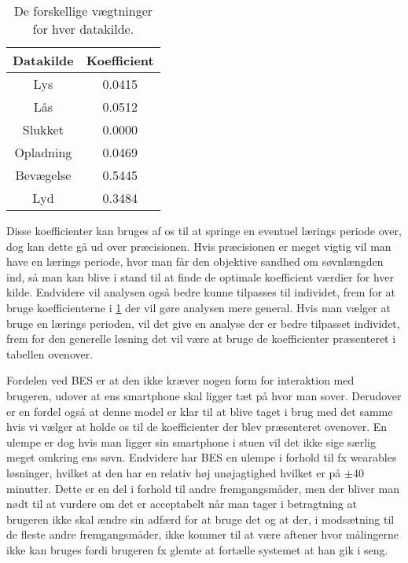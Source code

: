 \begin{table}[h]
\centering
\begin{tabular}{|c|c|}
\hline Datakilde & Koefficient\\
\hline Lys & 0.0415 \\ 
\hline Lås & 0.0512 \\ 
\hline Slukket & 0.0000 \\ 
\hline Opladning & 0.0469 \\ 
\hline Bevægelse & 0.5445 \\ 
\hline Lyd & 0.3484 \\ 
\hline 
\end{tabular}
\caption{De forskellige vægtninger for hver datakilde.}
\label{tab:vaegtninger}
\end{table}

Disse koefficienter kan bruges af os til at springe en eventuel lærings periode over, dog kan dette gå ud over præcisionen.
Hvis præcisionen er meget vigtig vil man have en lærings periode, hvor man får den objektive sandhed om søvnlængden ind, så man kan blive i stand til at finde de optimale koefficient værdier for hver kilde.
Endvidere vil analysen også bedre kunne tilpasses til individet, frem for at bruge koefficienterne i \cref{tab:vaegtninger} der vil gøre analysen mere general.
Hvis man vælger at bruge en lærings perioden, vil det give en analyse der er bedre tilpasset individet, frem for den generelle løsning det vil være at bruge de koefficienter præsenteret i tabellen ovenover.

Fordelen ved BES er at den ikke kræver nogen form for interaktion med brugeren, udover at ens smartphone skal ligger tæt på hvor man sover.
Derudover er en fordel også at denne model er klar til at blive taget i brug med det samme hvis vi vælger at holde os til de koefficienter der blev præsenteret ovenover.
En ulempe er dog hvis man ligger sin smartphone i stuen vil det ikke sige særlig meget omkring ens søvn.
Endvidere har BES en ulempe i forhold til fx wearables løsninger, hvilket at den har en relativ høj unøjagtighed hvilket er på $\pm$40 minutter. 
Dette er en del i forhold til andre fremgangsmåder, men der bliver man nødt til at vurdere om det er acceptabelt når man tager i betragtning at brugeren ikke skal ændre sin adfærd for at bruge det og at der, i modsætning til de fleste andre fremgangsmåder, ikke kommer til at være aftener hvor målingerne ikke kan bruges fordi brugeren fx glemte at fortælle systemet at han gik i seng.

